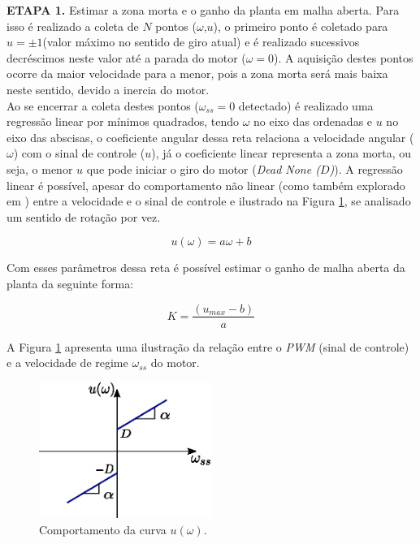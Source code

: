 \textbf{ETAPA 1.} Estimar a zona morta e o ganho da planta em malha aberta. Para isso é realizado a coleta de $N$ pontos ($\omega$,$u$), o primeiro ponto é coletado para $u = \pm1$(valor máximo no sentido de giro atual) e é realizado sucessivos decréscimos neste valor até a parada do motor ($\omega = 0$). A aquisição destes pontos ocorre da maior velocidade para a menor, pois a zona morta será mais baixa neste sentido, devido a inercia do motor.\\

Ao se encerrar a coleta destes pontos ($\omega_{ss} = 0$ detectado) é realizado uma regressão linear por mínimos quadrados, tendo $\omega$ no eixo das ordenadas e $u$ no eixo das abscisas, o coeficiente angular dessa reta relaciona a velocidade angular ($\omega$) com o sinal de controle ($u$), já o coeficiente linear representa a zona morta, ou seja, o menor $u$ que pode iniciar o giro do motor (\emph{Dead None ($D$)}). A regressão linear é possível, apesar do comportamento não linear (como também explorado em \cite{dead_zone}) entre a velocidade e o sinal de controle e ilustrado na Figura \ref{fig:ilustracao_omega_x_pwm}, se analisado um sentido de rotação por vez.

\begin{equation*}
    u(\omega) = a\omega + b
\end{equation*}

Com esses parâmetros dessa reta é possível estimar o ganho de malha aberta da planta da seguinte forma:

\begin{equation}
    K = \frac{(u_{max} - b)}{a}
\end{equation}

A Figura \ref{fig:ilustracao_omega_x_pwm} apresenta uma ilustração da relação entre o \emph{PWM} (sinal de controle) e a velocidade de regime $\omega_{ss}$ do motor.

\begin{figure}[H]
    \centering
    \includegraphics[width=0.5\textwidth]{figuras/ilustracoes/omega_x_sinal_controle.eps}
    \caption{Comportamento da curva $u(\omega)$.}
    \label{fig:ilustracao_omega_x_pwm}
\end{figure}

